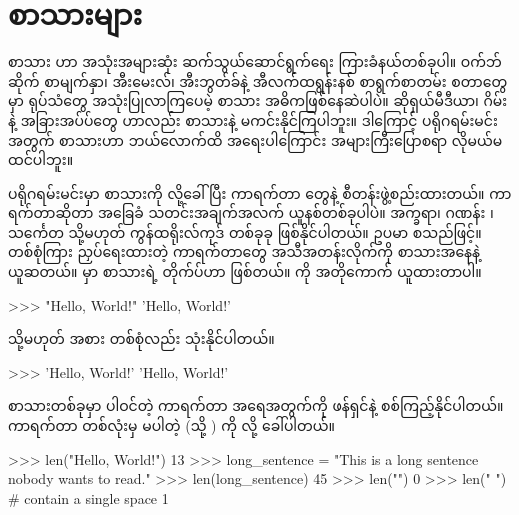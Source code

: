 \section{စာသားများ}
စာသား  ဟာ အသုံးအများဆုံး ဆက်သွယ်ဆောင်ရွက်ရေး ကြားခံနယ်တစ်ခုပါ။ ဝက်ဘ်ဆိုက် စာမျက်နှာ၊ အီးမေးလ်၊ အီးဘွတ်ခ်နဲ့ အီလက်ထရွန်းနစ် စာရွက်စာတမ်း  စတာတွေမှာ ရုပ်သံတွေ အသုံးပြုလာကြပေမဲ့ စာသား အဓိကဖြစ်နေဆဲပါပဲ။ ဆိုရှယ်မီဒီယာ၊ ဂိမ်းနဲ့ အခြားအပ်ပ်တွေ ဟာလည်း စာသားနဲ့ မကင်းနိုင်ကြပါဘူး။ ဒါကြောင့် ပရိုဂရမ်းမင်းအတွက် စာသားဟာ  ဘယ်လောက်ထိ အရေးပါကြောင်း အများကြီးပြောစရာ လိုမယ်မထင်ပါဘူး။ 

ပရိုဂရမ်းမင်းမှာ စာသားကို  လို့ခေါ်ပြီး ကာရက်တာ  တွေနဲ့ စီတန်းဖွဲ့စည်းထားတယ်။ ကာရက်တာဆိုတာ အခြေခံ သတင်းအချက်အလက် ယူနစ်တစ်ခုပါပဲ။ အက္ခရာ၊ ဂဏန်း ၊ သင်္ကေတ သို့မဟုတ် ကွန်ထရိုးလ်ကုဒ် တစ်ခုခု ဖြစ်နိုင်ပါတယ်။ ဥပမာ  စသည်ဖြင့်။ \fEn{)} တစ်စုံကြား ညှပ်ရေးထားတဲ့ ကာရက်တာတွေ အသီအတန်းလိုက်ကို စာသားအနေနဲ့ ယူဆတယ်။  မှာ စာသားရဲ့ တိုက်ပ်ဟာ  ဖြစ်တယ်။  ကို အတိုကောက် ယူထားတာပါ။ 
%
\setlength{\fboxsep}{0pt}
\begin{codetxt}
>>> "Hello, World!"
'Hello, World!'
\end{codetxt}
%
သို့မဟုတ်  အစား \fEn{)} တစ်စုံလည်း သုံးနိုင်ပါတယ်။ 
%
\setlength{\fboxsep}{0pt}
\begin{codetxt}
>>> 'Hello, World!'
'Hello, World!'
\end{codetxt}
%

စာသားတစ်ခုမှာ ပါဝင်တဲ့ ကာရက်တာ အရေအတွက်ကို  ဖန်ရှင်နဲ့ စစ်ကြည့်နိုင်ပါတယ်။ ကာရက်တာ တစ်လုံးမှ မပါတဲ့  (သို့ ) ကို  လို့ ခေါ်ပါတယ်။ 
%
\setlength{\fboxsep}{0pt}
\begin{codetxt}
>>> len("Hello, World!")
13
>>> long_sentence = "This is a long sentence nobody wants to read."
>>> len(long_sentence)
45
>>> len("")
0
>>> len(" ") # contain a single space
1
\end{codetxt}
%

